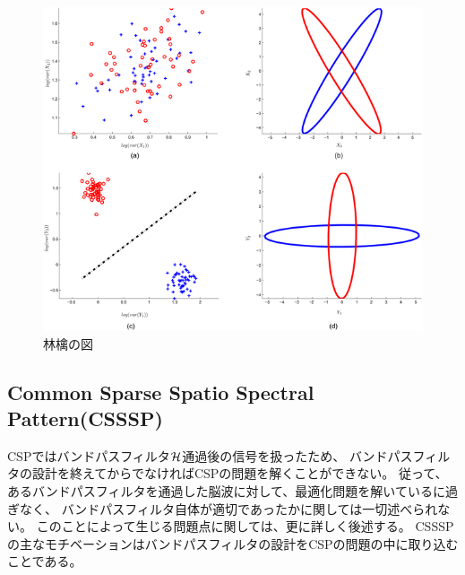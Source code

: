 \begin{figure}
    \centering
    \includegraphics[width=12cm]{images/apple.png}
    \caption{林檎の図}
\end{figure}
  

\subsection{\rm Common Sparse Spatio Spectral Pattern(CSSSP)}
CSPではバンドパスフィルタ\(\cal H\)通過後の信号を扱ったため、
バンドパスフィルタの設計を終えてからでなければCSPの問題を解くことができない。
従って、あるバンドパスフィルタを通過した脳波に対して、最適化問題を解いているに過ぎなく、
バンドパスフィルタ自体が適切であったかに関しては一切述べられない。
このことによって生じる問題点に関しては、更に詳しく後述する。
CSSSPの主なモチベーションはバンドパスフィルタの設計をCSPの問題の中に取り込むことである\cite{csssp}。

